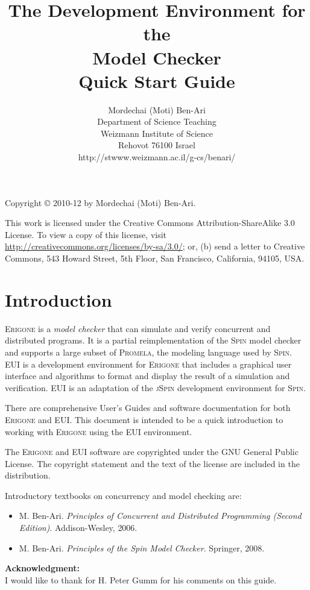 \documentclass[11pt]{article}
\title{The \eui{} Development Environment for the\\
\prg{} Model Checker\\Quick Start Guide}
\author{Mordechai (Moti) Ben-Ari\\
Department of Science Teaching\\
Weizmann Institute of Science\\
Rehovot 76100 Israel\\
\textsf{http://stwww.weizmann.ac.il/g-cs/benari/}}
\newcommand*{\prg}{\textsc{Erigone}}
\newcommand*{\eui}{\textsc{EUI}}
\newcommand*{\spn}{\textsc{Spin}}
\newcommand*{\jsp}{\textsc{jSpin}}
\newcommand*{\prm}{\textsc{Promela}}
\begin{document}
\maketitle
\thispagestyle{empty}

\vfill

\begin{center}
Copyright \copyright{} 2010-12 by Mordechai (Moti) Ben-Ari.
\end{center}
This work is licensed under the Creative Commons Attribution-ShareAlike 3.0
License. To view a copy of this license, visit
\url{http://creativecommons.org/licenses/by-sa/3.0/}; or, (b) send a letter
to Creative Commons, 543 Howard Street, 5th Floor, San Francisco,
California, 94105, USA.

\newpage

\section{Introduction}

\prg{} is a \emph{model checker} that can simulate and verify concurrent
and distributed programs. It is a partial reimplementation of the \spn{}
model checker and supports a large subset of \prm{}, the modeling language
used by \spn{}. \eui{} is a development environment for \prg{} that
includes a graphical user interface and algorithms to format and display
the result of a simulation and verification. \eui{} is an adaptation of the
\jsp{} development environment for \spn{}.

There are comprehensive User's Guides and software documentation for
both \prg{} and \eui{}. This document is intended to be a quick
introduction to working with \prg{} using the \eui{} environment.

The \prg{} and \eui{} software are copyrighted under the \textsc{GNU}
General Public License. The copyright statement and the text of the
license are included in the distribution.

Introductory textbooks on concurrency and model checking are:

\begin{itemize}
\item M. Ben-Ari. \textit{Principles of Concurrent and Distributed Programming (Second
Edition)}. Addison-Wesley, 2006.
\item M. Ben-Ari. \textit{Principles of the Spin Model Checker}.
Springer, 2008.
\end{itemize}

\textbf{Acknowledgment:}\\I would like to thank for H. Peter Gumm for
his comments on this guide.
\end{document}

